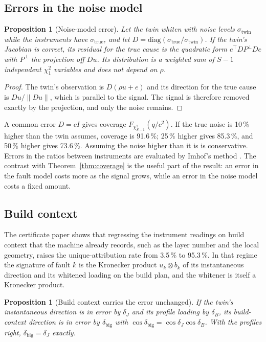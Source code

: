 \documentclass[preprint,12pt]{elsarticle}
\newtheorem{proposition}[theorem]{Proposition}
\begin{document}
\subsection{Errors in the noise model}

\begin{proposition}[Noise-model error]
\label{prop:noise}
Let the twin whiten with noise levels $\sigma_{\text{twin}}$ while the
instruments have $\sigma_{\text{true}}$, and let
$D = \mathrm{diag}(\sigma_{\text{true}}/\sigma_{\text{twin}})$. If the twin's
Jacobian is correct, its residual for the true cause is the quadratic form
$e^\top D P^\perp D e$ with $P^\perp$ the projection off $Du$. Its distribution
is a weighted sum of $S-1$ independent $\chi^2_1$ variables and does not
depend on $\rho$.
\end{proposition}

\begin{proof}
The twin's observation is $D(\rho u + e)$ and its direction for the true cause
is $Du/\|Du\|$, which is parallel to the signal. The signal is therefore
removed exactly by the projection, and only the noise remains.
\end{proof}

A common error $D = cI$ gives coverage $F_{\chi^2_{S-1}}(q/c^2)$. If the true
noise is 10\,\% higher than the twin assumes, coverage is 91.6\,\%; 25\,\%
higher gives 85.3\,\%, and 50\,\% higher gives 73.6\,\%. Assuming the noise
higher than it is is conservative.
Errors in the ratios between instruments are evaluated by Imhof's method
\cite{Imhof1961}. The contrast with Theorem~\ref{thm:coverage} is the useful
part of the result: an error in the fault model costs more as the signal grows,
while an error in the noise model costs a fixed amount.

\subsection{Build context}

The certificate paper shows that regressing the instrument readings on build
context that the machine already records, such as the layer number and the
local geometry, raises the unique-attribution rate from 3.5\,\% to 95.3\,\%. In
that regime the signature of fault $k$ is the Kronecker product
$u_k \otimes b_k$ of its instantaneous direction and its whitened loading on the
build plan, and the whitener is itself a Kronecker product.

\begin{proposition}[Build context carries the error unchanged]
\label{prop:kron}
If the twin's instantaneous direction is in error by $\delta_J$ and its profile
loading by $\delta_B$, its build-context direction is in error by
$\delta_{\text{big}}$ with $\cos\delta_{\text{big}} = \cos\delta_J\cos\delta_B$.
With the profiles right, $\delta_{\text{big}} = \delta_J$ exactly.
\end{proposition}
\end{document}
